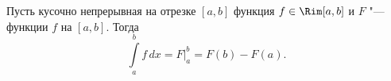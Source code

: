 \label{NL}
    	Пусть кусочно непрерывная на отрезке $[a,b]$ функция $f\in\Rim[a,b]$ и $F$ "--- \op{} функции $f$ на $[a,b]$. Тогда
    	\[\int\limits_a^bf\,dx=F\bigg|_a^b=F(b)-F(a).\]
    